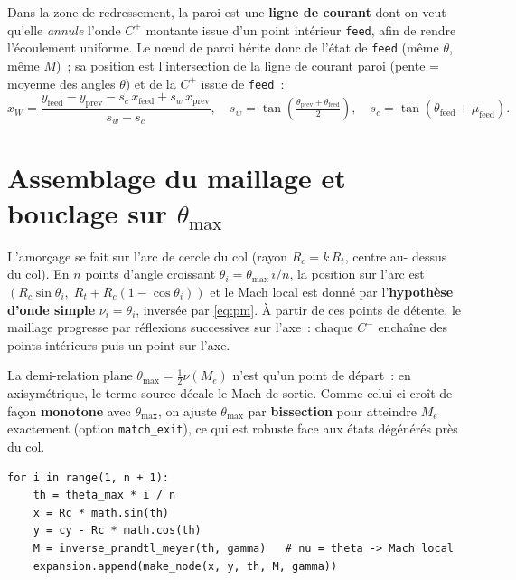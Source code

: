 \documentclass[11pt,a4paper]{article}
\newcommand{\ppar}[1]{\left(#1\right)}
\begin{document}
Dans la zone de redressement, la paroi est une \textbf{ligne de courant} dont
on veut qu'elle \emph{annule} l'onde $C^{+}$ montante issue d'un point intérieur
\texttt{feed}, afin de rendre l'écoulement uniforme. Le n\oe ud de paroi hérite
donc de l'état de \texttt{feed} (même $\theta$, même $M$)~; sa position est
l'intersection de la ligne de courant paroi (pente = moyenne des angles
$\theta$) et de la $C^{+}$ issue de \texttt{feed}~:
\begin{equation}
  x_W = \frac{y_{\text{feed}} - y_{\text{prev}}
              - s_c\,x_{\text{feed}} + s_w\,x_{\text{prev}}}{s_w - s_c},
  \quad
  s_w = \tan\!\ppar{\tfrac{\theta_{\text{prev}}+\theta_{\text{feed}}}{2}},
  \quad
  s_c = \tan(\theta_{\text{feed}}+\mu_{\text{feed}}).
\end{equation}

\section{Assemblage du maillage et bouclage sur \texorpdfstring{$\theta_{\max}$}{theta\_max}}

L'amorçage se fait sur l'arc de cercle du col (rayon $R_c = k\,R_t$, centre au-
dessus du col). En $n$ points d'angle croissant $\theta_i = \theta_{\max}\,i/n$,
la position sur l'arc est $(R_c\sin\theta_i,\; R_t + R_c(1-\cos\theta_i))$ et le
Mach local est donné par l'\textbf{hypothèse d'onde simple}
$\nu_i = \theta_i$, inversée par \eqref{eq:pm}. À partir de ces points de
détente, le maillage progresse par réflexions successives sur l'axe~: chaque
$C^{-}$ enchaîne des points intérieurs puis un point sur l'axe.

La demi-relation plane $\theta_{\max} = \tfrac12\nu(M_e)$ n'est qu'un point de
départ~: en axisymétrique, le terme source décale le Mach de sortie. Comme
celui-ci croît de façon \textbf{monotone} avec $\theta_{\max}$, on ajuste
$\theta_{\max}$ par \textbf{bissection} pour atteindre $M_e$ exactement (option
\texttt{match\_exit}), ce qui est robuste face aux états dégénérés près du col.

\begin{lstlisting}[style=py,caption={Points de détente sur l'arc du col (hypothèse d'onde simple).}]
for i in range(1, n + 1):
    th = theta_max * i / n
    x = Rc * math.sin(th)
    y = cy - Rc * math.cos(th)
    M = inverse_prandtl_meyer(th, gamma)   # nu = theta -> Mach local
    expansion.append(make_node(x, y, th, M, gamma))
\end{lstlisting}
\end{document}
